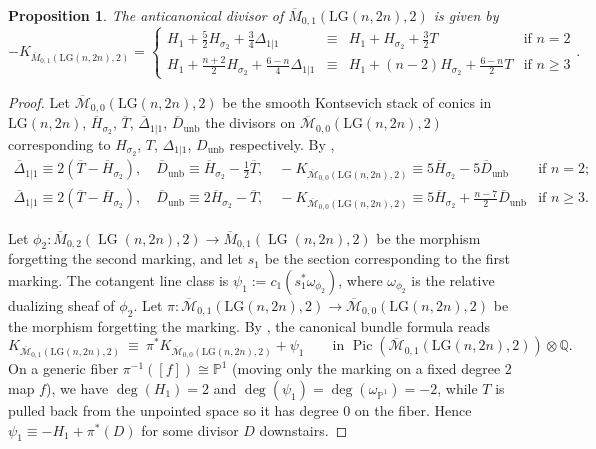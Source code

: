 \documentclass[10pt]{amsart}
\newtheorem{proposition}[theorem]{Proposition}
\theoremstyle{definition}
\newcommand{\Pic}{\operatorname{Pic}}
\newcommand{\LG}{\operatorname{LG}}
\newcommand{\QQ}{\mathbb{Q}}
\DeclareMathOperator{\unb}{unb}
\theoremstyle{plain} %
\begin{document}
\begin{proposition}\label{-K}
The anticanonical divisor of $\overline{M}_{0,1}(\mathrm{LG}(n,2n),2)$ is given by 
$$
-K_{\overline{M}_{0,1}(\mathrm{LG}(n,2n),2)} = \left\lbrace
\begin{array}{lcll}
H_1 + \frac{5}{2}H_{\sigma_2} + \frac{3}{4}\Delta_{1|1} & \equiv & H_1 + H_{\sigma_2} + \frac{3}{2}T & \text{if } n = 2\\ 
H_1 + \frac{n+2}{2}H_{\sigma_2} + \frac{6-n}{4}\Delta_{1|1} & \equiv & H_1+(n-2)H_{\sigma_2}+\frac{6-n}{2}T & \text{if } n \geq 3
\end{array}\right. .
$$
\end{proposition}
\begin{proof}
Let $\overline{\mathcal{M}}_{0,0}(\mathrm{LG}(n,2n),2)$ be the smooth Kontsevich stack of conics in $\mathrm{LG}(n,2n)$,  $\overline H_{\sigma_2}$, $\overline T$, $\overline\Delta_{1|1}$, $\overline D_{\mathrm{unb}}$ the divisors on $\overline{\mathcal{M}}_{0,0}(\mathrm{LG}(n,2n),2)$  corresponding to $H_{\sigma_2}$, $T$, $\Delta_{1|1}$, $D_{\mathrm{unb}}$ respectively.
By \cite[Proposition 6.15]{CM}, 
$$
\begin{array}{ll}
\overline\Delta_{1|1} \equiv 2(\overline T-\overline H_{\sigma_2}),\quad \overline D_{\unb} \equiv \overline H_{\sigma_2}-\frac{1}{2}\overline T,\quad -K_{\overline{\mathcal{M}}_{0,0}(\mathrm{LG}(n,2n),2)} \equiv 5\overline H_{\sigma_2}-5 \overline D_{\unb} & \text{if } n = 2;\\
\overline \Delta_{1|1} \equiv 2(\overline T-\overline H_{\sigma_2}),\quad \overline D_{\unb} \equiv 2\overline H_{\sigma_2}-\overline T,\quad -K_{\overline{\mathcal{M}}_{0,0}(\mathrm{LG}(n,2n),2)} \equiv 5\overline H_{\sigma_2}+\frac{n-7}{2} \overline D_{\unb} & \text{if } n \geq 3.
\end{array}
$$

Let $\phi_2:\overline{M}_{0,2}(\LG(n,2n),2)\to \overline{M}_{0,1}(\LG(n,2n),2)$ be the morphism forgetting the second marking, and let $s_1$ be the section corresponding to the first marking. The cotangent line class is $\psi_1:=c_1(s_1^*\omega_{\phi_2})$, where $\omega_{\phi_2}$ is the relative dualizing sheaf of $\phi_2$.
Let $\pi:\overline{\mathcal{M}}_{0,1}(\mathrm{LG}(n,2n),2)\longrightarrow \overline{\mathcal{M}}_{0,0}(\mathrm{LG}(n,2n),2)$ be the morphism forgetting the marking. By \cite[Theorem 1.1]{dJS17}, the canonical bundle formula reads
$$
K_{\overline{\mathcal{M}}_{0,1}(\mathrm{LG}(n,2n),2)}\ \equiv\ \pi^*K_{\overline{\mathcal{M}}_{0,0}(\mathrm{LG}(n,2n),2)}+\psi_1
\qquad\text{in }\Pic(\overline{\mathcal{M}}_{0,1}(\mathrm{LG}(n,2n),2))\otimes\QQ.
$$
On a generic fiber \(\pi^{-1}([f])\cong \mathbb P^1\) (moving only the marking on a fixed degree $2$ map \(f\)), we have \(\deg(H_1)=2\) and \(\deg(\psi_1)=\deg(\omega_{\mathbb P^1})=-2\), while \(T\) is pulled back from the unpointed space so it has degree \(0\) on the fiber. Hence \(\psi_1\equiv-H_1+\pi^*(D)\) for some divisor \(D\) downstairs.


\end{proof}
\end{document}
